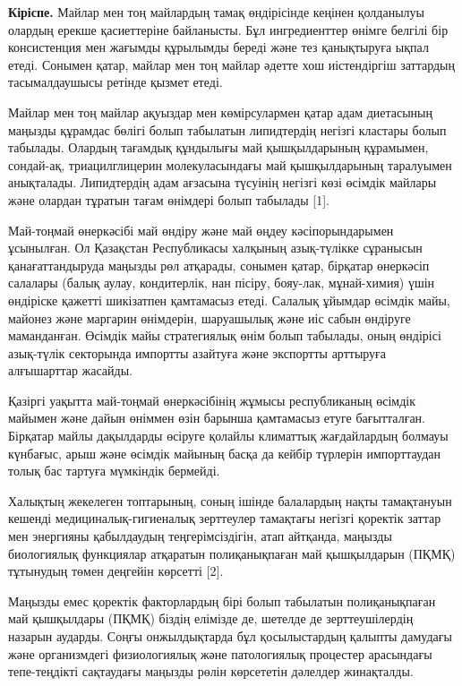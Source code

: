 \begin{multicols}{2}
{\bfseries Кіріспе.} Майлар мен тоң майлардың тамақ өндірісінде кеңінен
қолданылуы олардың ерекше қасиеттеріне байланысты. Бұл ингредиенттер
өнімге белгілі бір консистенция мен жағымды құрылымды береді және тез
қанықтыруға ықпал етеді. Сонымен қатар, майлар мен тоң майлар әдетте хош
иістендіргіш заттардың тасымалдаушысы ретінде қызмет етеді.

Майлар мен тоң майлар ақуыздар мен көмірсулармен қатар адам диетасының
маңызды құрамдас бөлігі болып табылатын липидтердің негізгі кластары
болып табылады. Олардың тағамдық құндылығы май қышқылдарының құрамымен,
сондай-ақ, триацилглицерин молекуласындағы май қышқылдарының таралуымен
анықталады. Липидтердің адам ағзасына түсуінің негізгі көзі өсімдік
майлары және олардан тұратын тағам өнімдері болып табылады {[}1{]}.

Май-тоңмай өнеркәсібі май өндіру және май өңдеу кәсіпорындарымен
ұсынылған. Ол Қазақстан Республикасы халқының азық-түлікке сұранысын
қанағаттандыруда маңызды рөл атқарады, сонымен қатар, бірқатар өнеркәсіп
салалары (балық аулау, кондитерлік, нан пісіру, бояу-лак, мұнай-химия)
үшін өндіріске қажетті шикізатпен қамтамасыз етеді. Салалық ұйымдар
өсімдік майы, майонез және маргарин өнімдерін, шаруашылық және иіс сабын
өндіруге маманданған. Өсімдік майы стратегиялық өнім болып табылады,
оның өндірісі азық-түлік секторында импортты азайтуға және экспортты
арттыруға алғышарттар жасайды.

Қазіргі уақытта май-тоңмай өнеркәсібінің жұмысы республиканың өсімдік
майымен және дайын өніммен өзін барынша қамтамасыз етуге бағытталған.
Бірқатар майлы дақылдарды өсіруге қолайлы климаттық жағдайлардың болмауы
күнбағыс, арыш және өсімдік майының басқа да кейбір түрлерін
импорттаудан толық бас тартуға мүмкіндік бермейді.

Халықтың жекелеген топтарының, соның ішінде балалардың нақты тамақтануын
кешенді медициналық-гигиеналық зерттеулер тамақтағы негізгі қоректік
заттар мен энергияны қабылдаудың теңгерімсіздігін, атап айтқанда,
маңызды биологиялық функциялар атқаратын полиқанықпаған май қышқылдарын
(ПҚМҚ) тұтынудың төмен деңгейін көрсетті {[}2{]}.

Маңызды емес қоректік факторлардың бірі болып табылатын полиқанықпаған
май қышқылдары (ПҚМҚ) біздің елімізде де, шетелде де зерттеушілердің
назарын аударды. Соңғы онжылдықтарда бұл қосылыстардың қалыпты дамудағы
және организмдегі физиологиялық және патологиялық процестер арасындағы
тепе-теңдікті сақтаудағы маңызды рөлін көрсететін дәлелдер жинақталды.


\end{multicols}
